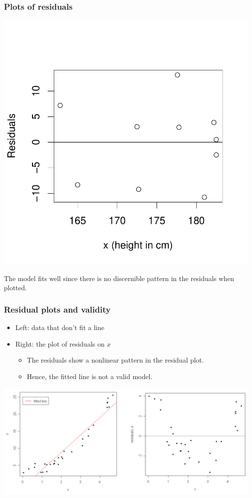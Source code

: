 \documentclass[handout]{beamer}
\numberwithin{equation}{section}
\begin{document}
\begin{frame}
\frametitle{\small Plots of residuals} \scriptsize
\vspace{-4em}
\begin{center}
\includegraphics{ch4part1-014}
\end{center}
\vspace{-3em}
The model fits well since there is no discernible pattern in the residuals when plotted.
\end{frame}

\begin{frame}
\frametitle{\small Residual plots and validity}
\begin{itemize}
\pause \item Left: data that don't fit a line
\pause \item Right: the plot of residuals on $x$
\begin{itemize}
\pause \item The residuals show a nonlinear pattern in the residual plot.
\pause \item Hence, the fitted line is not a valid model.
\end{itemize}
\end{itemize}
 \includegraphics{../../fig/residbad.png}
\end{frame}
\end{document}

